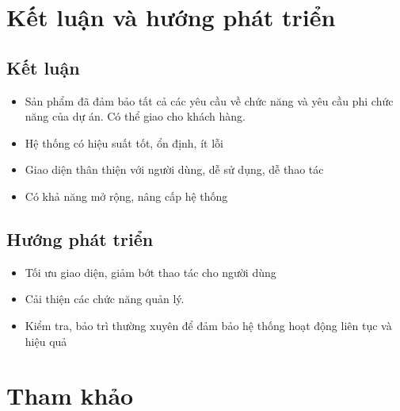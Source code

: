 \documentclass[a4paper, 12pt]{article}
\begin{document}
\clearpage

\section{Kết luận và hướng phát triển} 
\subsection {Kết luận}
\begin{itemize}
	\item Sản phẩm đã đảm bảo tất cả các yêu cầu về chức năng và yêu cầu phi chức năng của dự án. Có thể giao cho khách hàng.
	\item Hệ thống có hiệu suất tốt, ổn định, ít lỗi
	\item Giao diện thân thiện với người dùng, dễ sử dụng, dễ thao tác
	\item Có khả năng mở rộng, nâng cấp hệ thống
	
\end{itemize}

\subsection {Hướng phát triển}
\begin{itemize}
	\item Tối ưu giao diện, giảm bớt thao tác cho người dùng
	\item Cải thiện các chức năng quản lý.
	\item Kiểm tra, bảo trì thường xuyên để đảm bảo hệ thống hoạt động liên tục và hiệu quả
\end{itemize}

\clearpage

\section{Tham khảo}
\end{document}
